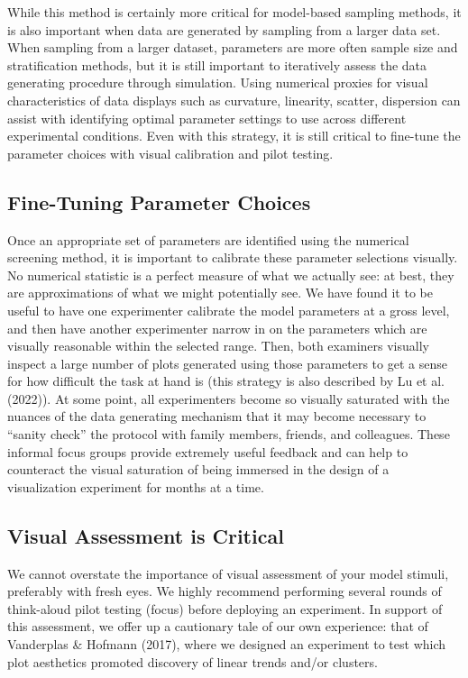 \documentclass[
  10pt,
  letterpaper,
  DIV=11,
  numbers=noendperiod]{scrartcl}
\begin{document}
While this method is certainly more critical for model-based sampling
methods, it is also important when data are generated by sampling from a
larger data set. When sampling from a larger dataset, parameters are
more often sample size and stratification methods, but it is still
important to iteratively assess the data generating procedure through
simulation. Using numerical proxies for visual characteristics of data
displays such as curvature, linearity, scatter, dispersion can assist
with identifying optimal parameter settings to use across different
experimental conditions. Even with this strategy, it is still critical
to fine-tune the parameter choices with visual calibration and pilot
testing.

\subsection{Fine-Tuning Parameter
Choices}\label{fine-tuning-parameter-choices}

Once an appropriate set of parameters are identified using the numerical
screening method, it is important to calibrate these parameter
selections visually. No numerical statistic is a perfect measure of what
we actually see: at best, they are approximations of what we might
potentially see. We have found it to be useful to have one experimenter
calibrate the model parameters at a gross level, and then have another
experimenter narrow in on the parameters which are visually reasonable
within the selected range. Then, both examiners visually inspect a large
number of plots generated using those parameters to get a sense for how
difficult the task at hand is (this strategy is also described by Lu et
al. (2022)). At some point, all experimenters become so visually
saturated with the nuances of the data generating mechanism that it may
become necessary to ``sanity check'' the protocol with family members,
friends, and colleagues. These informal focus groups provide extremely
useful feedback and can help to counteract the visual saturation of
being immersed in the design of a visualization experiment for months at
a time.

\subsection{Visual Assessment is
Critical}\label{visual-assessment-is-critical}

We cannot overstate the importance of visual assessment of your model
stimuli, preferably with fresh eyes. We highly recommend performing
several rounds of think-aloud pilot testing (focus) before deploying an
experiment. In support of this assessment, we offer up a cautionary tale
of our own experience: that of Vanderplas \& Hofmann (2017), where we
designed an experiment to test which plot aesthetics promoted discovery
of linear trends and/or clusters.
\end{document}
